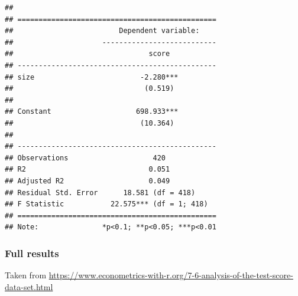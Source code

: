 \documentclass[]{book}
\begin{document}
\begin{verbatim}
## 
## ===============================================
##                         Dependent variable:    
##                     ---------------------------
##                                score           
## -----------------------------------------------
## size                         -2.280***         
##                               (0.519)          
##                                                
## Constant                    698.933***         
##                              (10.364)          
##                                                
## -----------------------------------------------
## Observations                    420            
## R2                             0.051           
## Adjusted R2                    0.049           
## Residual Std. Error      18.581 (df = 418)     
## F Statistic           22.575*** (df = 1; 418)  
## ===============================================
## Note:               *p<0.1; **p<0.05; ***p<0.01
\end{verbatim}

\subsubsection{Full results}\label{full-results}

Taken from
\url{https://www.econometrics-with-r.org/7-6-analysis-of-the-test-score-data-set.html}
\end{document}
